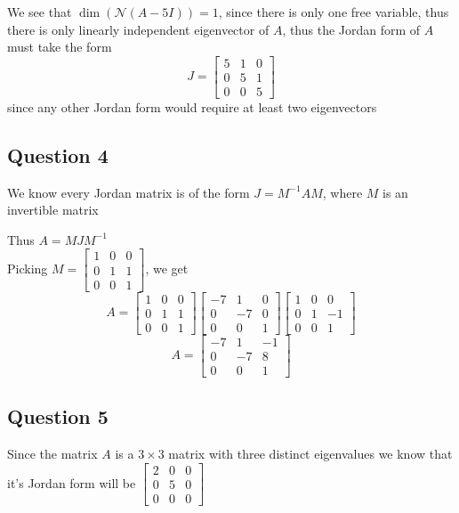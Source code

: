 \documentclass{article}
\begin{document}
We see that \(\dim(\mathcal{N}(A - 5I)) = 1\), since there is only one free variable,
thus there is only linearly independent eigenvector of \(A\), thus the Jordan form of 
\(A\) must take the form 
\[
J = \begin{bmatrix}
    5 & 1 & 0 \\
    0 & 5 & 1 \\
    0 & 0 & 5
\end{bmatrix}
\]
since any other Jordan form would require at least two eigenvectors


\subsection*{Question 4}
We know every Jordan matrix is of the form \(J = M^{-1} A M\), where \(M\) is an 
invertible matrix

Thus \(A  = MJM^{-1}\)
\\

Picking \(M = \begin{bmatrix}
    1 & 0 & 0 \\
    0 & 1 & 1 \\
    0 & 0 & 1
\end{bmatrix}\), we get
\[
A = \begin{bmatrix}
    1 & 0 & 0 \\
    0 & 1 & 1 \\
    0 & 0 & 1
\end{bmatrix}
\begin{bmatrix}
    -7 & 1 & 0 \\
    0 & -7 & 0 \\
    0 & 0 & 1
\end{bmatrix}
\begin{bmatrix}
    1 & 0 & 0 \\
    0 & 1 & -1 \\
    0 & 0 & 1
\end{bmatrix}
\]
\[
A = \begin{bmatrix}
    -7 & 1 & -1 \\
    0 & -7 & 8 \\
    0 & 0 & 1
\end{bmatrix}
\]


\subsection*{Question 5}
Since the matrix \(A\) is a \(3 \times 3\) matrix with three distinct eigenvalues 
we know that it's Jordan form will be \(\begin{bmatrix}
    2 & 0 & 0 \\
    0 & 5 & 0 \\
    0 & 0 & 0 
\end{bmatrix}\)
\\
\end{document}
